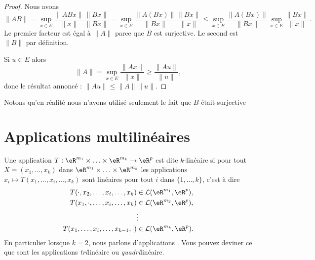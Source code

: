 \begin{proof}
    Nous avons
    \begin{equation}
    \| AB \|=\sup_{x\in E}\frac{ \| ABx \| }{ \| x \| }\frac{ \| Bx \| }{ \| Bx \| }=\sup_{x\in E}\frac{ \| A(Bx) \| }{ \| Bx \| }\frac{ \| Bx \| }{ \| x \| }\leq \sup_{x\in E}\frac{ \| A(Bx) \| }{ \| Bx \| }\sup_{x\in E}\frac{ \| Bx \| }{ \| x \| }.
    \end{equation}
    Le premier facteur est égal à \( \| A \|\) parce que \( B\) est surjective. Le second est \( \| B \|\) par définition.

    Si \( u\in E\) alors
    \begin{equation}
        \| A \|=\sup_{x\in E}\frac{ \| Ax \| }{ \| x \| }\geq \frac{ \| Au \| }{ \| u \| },
    \end{equation}
    donc le résultat annoncé : \( \| Au \|\leq \| A \|\| u \|\).
\end{proof}
Notons qu'en réalité nous n'avons utilisé seulement le fait que \( B\) était surjective

\section{Applications multilinéaires}

\begin{definition}
 	Une application $T: \eR^{m_1}\times \ldots \times\eR^{m_k}\to\eR^p $ est dite $k$-linéaire si pour tout $X=(x_1, \ldots,x_k)$ dans $ \eR^{m_1}\times \ldots \times\eR^{m_k}$ les applications $x_i\mapsto T(x_1, \ldots, x_i,\ldots,x_k)$ sont linéaires pour tout $i$ dans $\{1,\ldots,k\}$, c'est à dire
	\begin{equation}
		\begin{aligned}[]
			T(\cdot,x_2, \ldots, x_i,\ldots,x_k)&\in \mathcal{L}(\eR^{m_1}, \eR^p),\\
			T(x_1,\cdot, \ldots, x_i,\ldots,x_k)&\in \mathcal{L}(\eR^{m_2}, \eR^p),\\
						& \vdots\\
			T(x_1, \ldots, x_i,\ldots,x_{k-1},\cdot)&\in \mathcal{L}(\eR^{m_k}, \eR^p).\\
		\end{aligned}
	\end{equation}
	En particulier lorsque $k=2$, nous parlons d'applications . Vous pouvez deviner ce que sont les applications \emph{tri}linéaire ou \emph{quadri}linéaire.
\end{definition}

